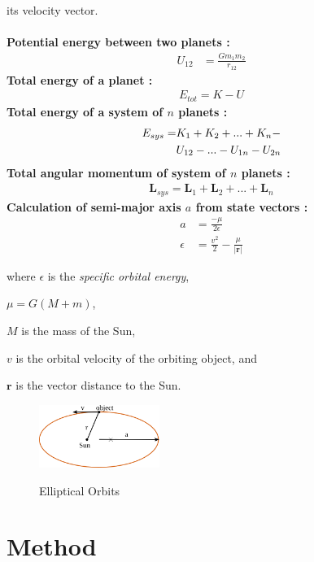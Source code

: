 \documentclass{article}%
\begin{document}
its velocity vector.\\
\\
\textbf{Potential energy between two planets :}
\begin{align}
	U_{12} &= \frac{Gm_1m_2}{r_{12}}
\end{align}
\textbf{Total energy of a planet :}
\begin{align}
	E_{tot} = K - U
\end{align}
\textbf{Total energy of a system of $n$ planets :}
\begin{align}
	E_{sys} = &K_1 + K_2 + ... + K_n -\notag\\
	          &U_{12} - ... - U_{1n} - U_{2n}
\end{align}
\textbf{Total angular momentum of system of $n$ planets :}
\begin{align}
	\mathbf{L}_{sys} = \mathbf{L}_1 + \mathbf{L}_2 + ... + \mathbf{L}_n
\end{align}
\textbf{Calculation of semi-major axis $a$ from state vectors :}
\begin{align}
	a &= \frac{-\mu}{2\epsilon}\\
	\epsilon &= \frac {v^2}{2} - \frac{\mu}{|\mathbf{r}|}
\end{align}

where $\epsilon$ is the \emph{specific orbital energy},

$\mu = G(M + m)$,

$M$ is the mass of the Sun, 

$v$ is the orbital velocity of the orbiting object, and

$\mathbf{r}$ is the vector distance to the Sun.
\begin{figure}[h!]
	\centering
		\includegraphics[width=0.35\textwidth]{images/orbits.png}
	\label{fig:orbits}
	\caption{Elliptical Orbits}
\end{figure}

\section{Method}
\end{document}

